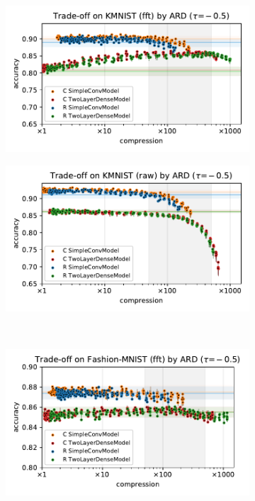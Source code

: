 \documentclass[a4paper,10pt,onecolumn]{article}
\begin{document}
\begin{figure}[b]
  \begin{subfigure}[b]{0.5\columnwidth}
    \centering
    \includegraphics[width=\columnwidth]{figure__mnist-like__trade-off/appendix__ARD__kmnist__fft__-0.5.pdf}
  \end{subfigure}%
  \begin{subfigure}[b]{0.5\columnwidth}
    \centering
    \includegraphics[width=\columnwidth]{figure__mnist-like__trade-off/appendix__ARD__kmnist__raw__-0.5.pdf}
  \end{subfigure} \\ %
  \begin{subfigure}[b]{0.5\columnwidth}
    \centering
    \includegraphics[width=\columnwidth]{figure__mnist-like__trade-off/appendix__ARD__fashionmnist__fft__-0.5.pdf}

\end{subfigure}
\end{figure}
\end{document}
